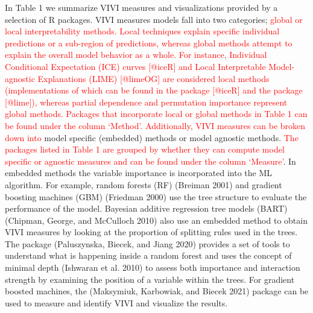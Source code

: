 In Table 1 we summarize VIVI measures and visualizations
provided by a selection of R packages. VIVI measures models fall into two categories;
\textcolor{red}{global or local interpretability methods. Local techniques explain specific individual predictions or a sub-region of predictions, whereas global methods attempt to explain the overall model behavior as a whole. For instance, Individual Conditional Expectation (ICE) curves [@iceR] and Local Interpretable Model-agnostic Explanations (LIME) [@limeOG] are considered local methods (implementations of which can be found in the  package [@iceR] and the  package [@lime]), whereas partial dependence and permutation importance represent global methods. Packages that incorporate local or global methods in Table 1 can be found under the column `Method'. Additionally, VIVI measures can be broken down into} model specific (embedded) methods or
model agnostic methods. \textcolor{red}{The packages listed in Table 1 are grouped by whether they can compute model specific or agnostic measures and can be found under the column `Measure'}. In embedded methods the variable importance is
incorporated into the ML algorithm. For example, random forests (RF)
(Breiman 2001) and gradient boosting machines (GBM) (Friedman 2000) use the tree structure to evaluate the performance of the
model. Bayesian additive regression tree models (BART) (Chipman, George, and McCulloch 2010)
also use an embedded method to obtain VIVI measures by looking at the
proportion of splitting rules used in the trees. The package  (Paluszynska, Biecek, and Jiang 2020) provides
a set of tools to understand what is happening inside a random forest
and uses the concept of minimal depth (Ishwaran et al. 2010) to assess both importance and interaction
strength by examining the position of a variable within the trees. For
gradient boosted machines, the  (Maksymiuk, Karbowiak, and Biecek 2021) package can be used to measure and identify VIVI and visualize the results.

